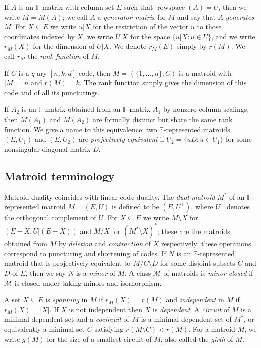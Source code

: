 \documentclass[12pt]{amsart}
\theoremstyle{definition}
\newcommand{\bF}{\mathbb F}
\newcommand{\cM}{\mathcal{M}}
\DeclareMathOperator{\rowspace}{rowspace}
\newcommand{\del}{\!\setminus\!}
\newcommand{\con}{/}
\begin{document}
  If $A$ is an $\bF$-matrix with column set $E$ such that $\rowspace(A) = U$, then we write $M = M(A)$; we call $A$ a \emph{generator matrix} for $M$ and say that $A$ \emph{generates} $M$. For $X \subseteq E$ we write $u|X$ for the restriction of the vector $u$ to those coordinates indexed by $X$, we write $U|X$ for the space $\{u|X: u \in U\}$, and we write $r_M(X)$ for the dimension of $U|X$. We denote $r_M(E)$ simply by $r(M)$. We call $r_M$ the \emph{rank function} of $M$.

If $C$ is a $q$-ary $[n,k,d]$ code, then $M = (\{1,\ldots, n\}, C)$ is a matroid with $|M| = n$ and $r(M) = k$. The rank function simply gives the dimension of this code and of all its puncturings.
  
  If $A_2$ is an $\bF$-matrix obtained from an $\bF$-matrix $A_1$ by nonzero column scalings, then $M(A_1)$ and $M(A_2)$ are formally distinct but share the same rank function. We give a name to this equivalence: two $\bF$-represented matroids $(E,U_1)$ and $(E,U_2)$ are \emph{projectively equivalent} if $U_2 = \{uD: u \in U_1\}$ for some nonsingular diagonal matrix $D$. 
  
  \subsection*{Matroid terminology} Matroid duality coincides with linear code duality. The \emph{dual matroid} $M^*$ of an $\bF$-represented matroid $M = (E,U)$ is defined to be $(E,U^{\perp})$, where $U^\perp$ denotes the orthogonal complement of $U$. For $X \subseteq E$ we write $M \del X$ for $(E-X,U|(E-X))$ and $M \con X$ for $(M^* \del X)^*$; these are the matroids obtained from $M$ by \emph{deletion} and \emph{contraction} of $X$ respectively; these operations correspond to puncturing and shortening of codes. If $N$ is an $\bF$-represented matroid that is projectively equivalent to $M \con C \del D$ for some disjoint subsets $C$ and $D$ of $E$, then we say $N$ is a \emph{minor} of $M$. A class $\cM$ of matroids is \emph{minor-closed} if $\cM$ is closed under taking minors and isomorphism. 
    
   A set $X \subseteq E$ is \emph{spanning} in $M$ if $r_M(X) = r(M)$ and \emph{independent} in $M$ if $r_M(X) = |X|$. If $X$ is not independent then $X$ is \emph{dependent}. A \emph{circuit} of $M$ is a minimal dependent set and a \emph{cocircuit} of $M$ is a minimal dependent set of $M^*$, or equivalently a minimal set $C$ satisfying $r(M \del C) < r(M)$. For a matroid $M$, we write $g(M)$ for the size of a smallest circuit of $M$, also called the \emph{girth} of $M$.
\end{document}

